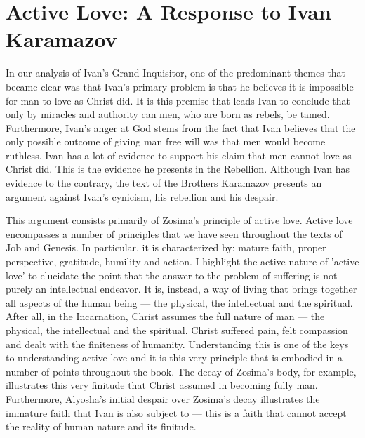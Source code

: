 \section{Active Love: A Response to Ivan Karamazov}

In our analysis of Ivan's Grand Inquisitor, one of the predominant themes that became clear was that Ivan's primary problem is that he believes it is impossible for man to love as Christ did. It is this premise that leads Ivan to conclude that only by miracles and authority can men, who are born as rebels, be tamed. Furthermore, Ivan's anger at God stems from the fact that Ivan believes that the only possible outcome of giving man free will was that men would become ruthless. Ivan has a lot of evidence to support his claim that men cannot love as Christ did. This is the evidence he presents in the Rebellion. Although Ivan has evidence to the contrary, the text of the Brothers Karamazov presents an argument against Ivan's cynicism, his rebellion and his despair.

This argument consists primarily of Zosima's principle of active love. Active love encompasses a number of principles that we have seen throughout the texts of Job and Genesis. In particular, it is characterized by: mature faith, proper perspective, gratitude, humility and action. I highlight the active nature of 'active love' to elucidate the point that the answer to the problem of suffering is not purely an intellectual endeavor. It is, instead, a way of living that brings together all aspects of the human being --- the physical, the intellectual and the spiritual. After all, in the Incarnation, Christ assumes the full nature of man --- the physical, the intellectual and the spiritual. Christ suffered pain, felt compassion and dealt with the finiteness of humanity. Understanding this is one of the keys to understanding active love and it is this very principle that is embodied in a number of points throughout the book. The decay of Zosima's body, for example, illustrates this very finitude that Christ assumed in becoming fully man. Furthermore, Alyosha's initial despair over Zosima's decay illustrates the immature faith that Ivan is also subject to --- this is a faith that cannot accept the reality of human nature and its finitude.

